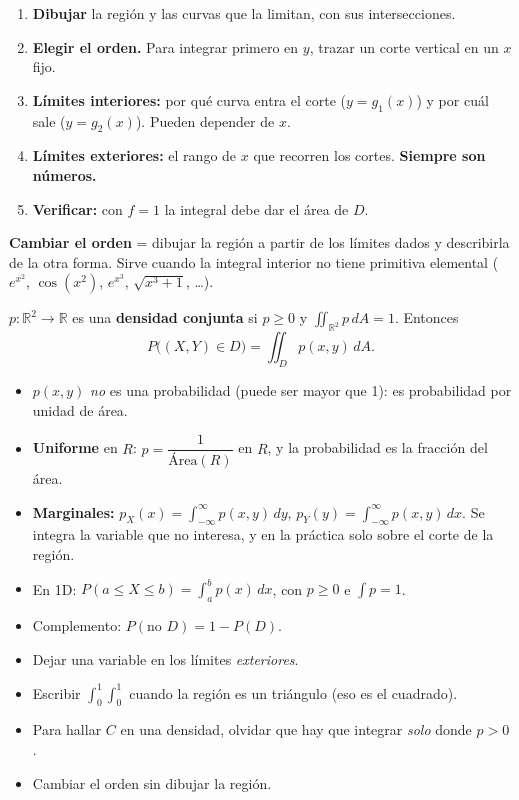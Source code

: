 \documentclass[11pt,a4paper]{article}
\newcommand{\R}{\mathbb{R}}
\newcommand{\dA}{\,dA}
\begin{document}
\begin{receta}
\begin{enumerate}[leftmargin=*,itemsep=1pt]
\item \textbf{Dibujar} la región y las curvas que la limitan, con sus intersecciones.
\item \textbf{Elegir el orden.} Para integrar primero en $y$, trazar un corte vertical en un $x$ fijo.
\item \textbf{Límites interiores:} por qué curva entra el corte ($y=g_1(x)$) y por cuál sale ($y=g_2(x)$). Pueden depender de $x$.
\item \textbf{Límites exteriores:} el rango de $x$ que recorren los cortes. \textbf{Siempre son números.}
\item \textbf{Verificar:} con $f=1$ la integral debe dar el área de $D$.
\end{enumerate}
\textbf{Cambiar el orden} = dibujar la región a partir de los límites dados y describirla de la otra forma. Sirve cuando la integral interior no tiene primitiva elemental ($e^{x^2}$, $\cos(x^2)$, $e^{x^3}$, $\sqrt{x^3+1}$, \dots).
\end{receta}

\begin{resumen}
$p:\R^2\to\R$ es una \textbf{densidad conjunta} si $p\ge0$ y $\iint_{\R^2}p\dA=1$. Entonces
\[
P\big((X,Y)\in D\big)=\iint_D p(x,y)\dA .
\]
\begin{itemize}[leftmargin=*,itemsep=1pt]
\item $p(x,y)$ \emph{no} es una probabilidad (puede ser mayor que 1): es probabilidad por unidad de área.
\item \textbf{Uniforme} en $R$: $p=\dfrac1{\text{Área}(R)}$ en $R$, y la probabilidad es la fracción del área.
\item \textbf{Marginales:} $p_X(x)=\displaystyle\int_{-\infty}^{\infty}p(x,y)\,dy$, \quad $p_Y(y)=\displaystyle\int_{-\infty}^{\infty}p(x,y)\,dx$. Se integra la variable que no interesa, y en la práctica solo sobre el corte de la región.
\item En 1D: $P(a\le X\le b)=\int_a^b p(x)\,dx$, con $p\ge0$ e $\int p=1$.
\item Complemento: $P(\text{no }D)=1-P(D)$.
\end{itemize}
\end{resumen}

\begin{ojo}
\begin{itemize}[leftmargin=*,itemsep=1pt]
\item Dejar una variable en los límites \emph{exteriores}.
\item Escribir $\int_0^1\int_0^1$ cuando la región es un triángulo (eso es el cuadrado).
\item Para hallar $C$ en una densidad, olvidar que hay que integrar \emph{solo} donde $p>0$.
\item Cambiar el orden sin dibujar la región.
\end{itemize}
\end{ojo}
\end{document}
